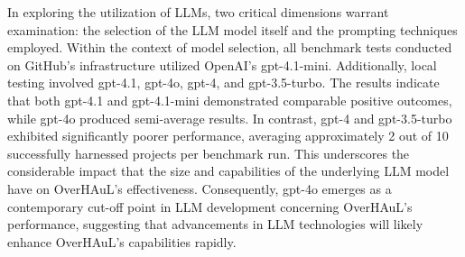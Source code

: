 \documentclass[
  a4paper,
]{scrreprt}
\newenvironment{Shaded}{\begin{snugshade}}{\end{snugshade}}
\newcommand{\CommentTok}[1]{\textcolor[rgb]{0.41,0.41,0.41}{#1}}
\newcommand{\ControlFlowTok}[1]{\textcolor[rgb]{0.85,0.12,0.09}{#1}}
\newcommand{\DataTypeTok}[1]{\textcolor[rgb]{0.47,0.16,0.63}{#1}}
\newcommand{\DecValTok}[1]{\textcolor[rgb]{0.47,0.16,0.63}{#1}}
\newcommand{\KeywordTok}[1]{\textcolor[rgb]{0.85,0.12,0.09}{#1}}
\newcommand{\NormalTok}[1]{\textcolor[rgb]{0.33,0.33,0.33}{#1}}
\newcommand{\OperatorTok}[1]{\textcolor[rgb]{0.00,0.46,0.62}{#1}}
\theoremstyle{definition}
\theoremstyle{remark}
\begin{document}
%

In exploring the utilization of LLMs, two critical dimensions warrant
examination: the selection of the LLM model itself and the prompting
techniques employed. Within the context of model selection, all
benchmark tests conducted on GitHub's infrastructure utilized OpenAI's
gpt-4.1-mini. Additionally, local testing involved gpt-4.1, gpt-4o,
gpt-4, and gpt-3.5-turbo. The results indicate that both gpt-4.1 and
gpt-4.1-mini demonstrated comparable positive outcomes, while gpt-4o
produced semi-average results. In contrast, gpt-4 and gpt-3.5-turbo
exhibited significantly poorer performance, averaging approximately 2
out of 10 successfully harnessed projects per benchmark run. This
underscores the considerable impact that the size and capabilities of
the underlying LLM model have on OverHAuL's effectiveness. Consequently,
gpt-4o emerges as a contemporary cut-off point in LLM development
concerning OverHAuL's performance, suggesting that advancements in LLM
technologies will likely enhance OverHAuL's capabilities rapidly.
\end{document}
